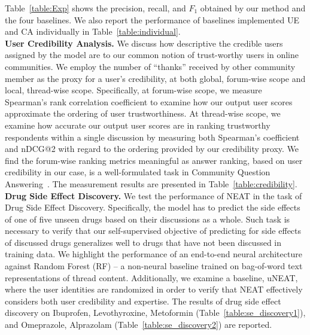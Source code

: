 \documentclass{bmcart}
\begin{document}

Table~\ref{table:Exp} shows the precision, recall, and $F_{1}$ obtained by our method and the four baselines. We also report the performance of baselines implemented UE and CA individually in Table~\ref{table:individual}. \\ 

{\bf User Credibility Analysis.} We discuss how descriptive the credible users assigned by the model are to our common notion of trust-worthy users in online communities. 
We employ the number of ``thanks'' received by other community member as the proxy for a user's credibility, at both global, forum-wise scope and local, thread-wise scope. Specifically, at forum-wise scope, we measure Spearman's rank correlation coefficient to examine how our output user scores approximate the ordering of user trustworthiness.
At thread-wise scope, we examine how accurate our output user scores are in ranking trustworthy respondents within a single discussion by measuring both Spearman's coefficient and nDCG@2 with regard to the ordering provided by our credibility proxy. We find the forum-wise ranking metrics meaningful as answer ranking, based on user credibility in our case, is a well-formulated task in Community Question Answering~\cite{nie2017data, surdeanu2008learning,nakov2016semeval}. The measurement results are presented in Table~\ref{table:credibility}. \\ 

{\bf Drug Side Effect Discovery.} We test the performance of NEAT in the task of Drug Side Effect Discovery. Specifically, the model has to predict the side effects of one of five unseen drugs based on their discussions as a whole. Such task is necessary to verify that our self-supervised objective of predicting for side effects of discussed drugs generalizes well to
drugs that have not been discussed in training data. We highlight the performance of an end-to-end neural architecture against Random Forest (RF) -- a non-neural baseline trained on bag-of-word text representations of thread content. Additionally, we examine a baseline, uNEAT, where the user identities are randomized in order to verify that NEAT effectively considers both user credibility and expertise. The results of drug side effect discovery on Ibuprofen, Levothyroxine, Metoformin (Table~\ref{table:se_discovery1}), and Omeprazole, Alprazolam (Table~\ref{table:se_discovery2}) are reported. \\
\end{document}

